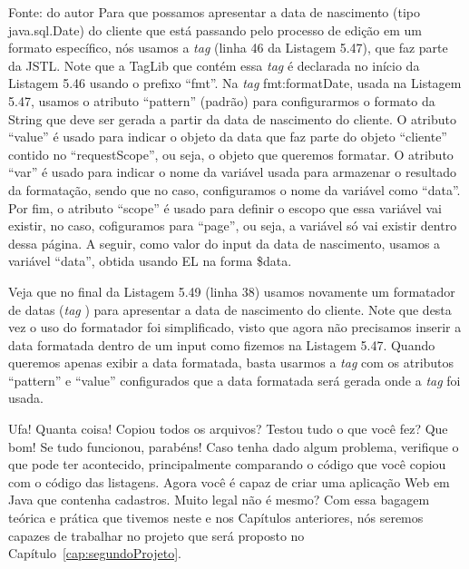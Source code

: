 
Fonte: do autor
Para que possamos apresentar a data de nascimento (tipo java.sql.Date) do cliente que está passando pelo processo de edição em um formato específico, nós usamos a \textit{tag}  (linha 46 da Listagem 5.47), que faz parte da JSTL. Note que a TagLib que contém essa \textit{tag} é declarada no início da Listagem 5.46 usando o prefixo ``fmt''. Na \textit{tag} fmt:formatDate, usada na Listagem 5.47, usamos o atributo ``pattern'' (padrão) para configurarmos o formato da String que deve ser gerada a partir da data de nascimento do cliente. O atributo ``value'' é usado para indicar o objeto da data que faz parte do objeto ``cliente'' contido no ``requestScope'', ou seja, o objeto que queremos formatar. O atributo ``var'' é usado para indicar o nome da variável usada para armazenar o resultado da formatação, sendo que no caso, configuramos o nome da variável como ``data''. Por fim, o atributo ``scope'' é usado para definir o escopo que essa variável vai existir, no caso, cofiguramos para ``page'', ou seja, a variável só vai existir dentro dessa página. A seguir, como valor do input da data de nascimento, usamos a variável ``data'', obtida usando EL na forma \${data}.


Veja que no final da Listagem 5.49 (linha 38) usamos novamente um formatador de datas (\textit{tag} ) para apresentar a data de nascimento do cliente. Note que desta vez o uso do formatador foi simplificado, visto que agora não precisamos inserir a data formatada dentro de um input como fizemos na Listagem 5.47. Quando queremos apenas exibir a data formatada, basta usarmos a \textit{tag}  com os atributos ``pattern'' e ``value'' configurados que a data formatada será gerada onde a \textit{tag} foi usada.

Ufa! Quanta coisa! Copiou todos os arquivos? Testou tudo o que você fez? Que bom! Se tudo funcionou, parabéns! Caso tenha dado algum problema, verifique o que pode ter acontecido, principalmente comparando o código que você copiou com o código das listagens. Agora você é capaz de criar uma aplicação Web em Java que contenha cadastros. Muito legal não é mesmo? Com essa bagagem teórica e prática que tivemos neste e nos Capítulos anteriores, nós seremos capazes de trabalhar no projeto que será proposto no Capítulo~\ref{cap:segundoProjeto}.

